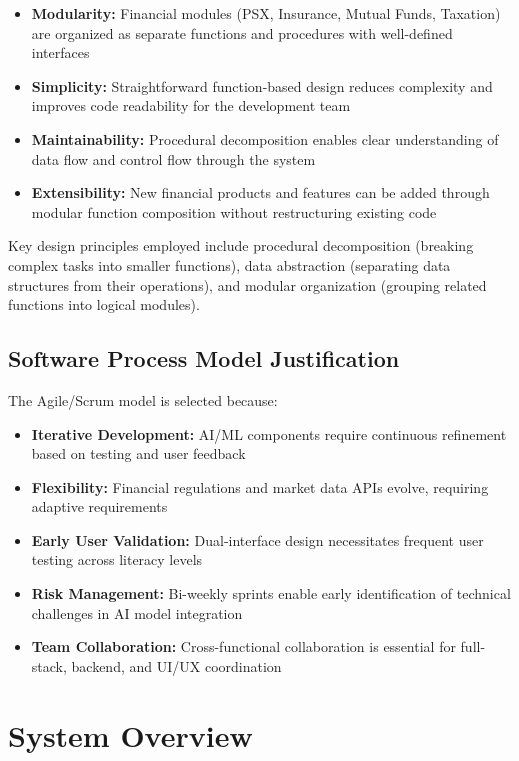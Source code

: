 \documentclass[12pt,a4paper]{report}
\begin{document}
\begin{itemize}
    \item \textbf{Modularity:} Financial modules (PSX, Insurance, Mutual Funds, Taxation) are organized as separate functions and procedures with well-defined interfaces
    \item \textbf{Simplicity:} Straightforward function-based design reduces complexity and improves code readability for the development team
    \item \textbf{Maintainability:} Procedural decomposition enables clear understanding of data flow and control flow through the system
    \item \textbf{Extensibility:} New financial products and features can be added through modular function composition without restructuring existing code
\end{itemize}

Key design principles employed include procedural decomposition (breaking complex tasks into smaller functions), data abstraction (separating data structures from their operations), and modular organization (grouping related functions into logical modules).

\section{Software Process Model Justification}
The Agile/Scrum model is selected because:

\begin{itemize}
    \item \textbf{Iterative Development:} AI/ML components require continuous refinement based on testing and user feedback
    \item \textbf{Flexibility:} Financial regulations and market data APIs evolve, requiring adaptive requirements
    \item \textbf{Early User Validation:} Dual-interface design necessitates frequent user testing across literacy levels
    \item \textbf{Risk Management:} Bi-weekly sprints enable early identification of technical challenges in AI model integration
    \item \textbf{Team Collaboration:} Cross-functional collaboration is essential for full-stack, backend, and UI/UX coordination
\end{itemize}

\chapter{System Overview}
\end{document}
